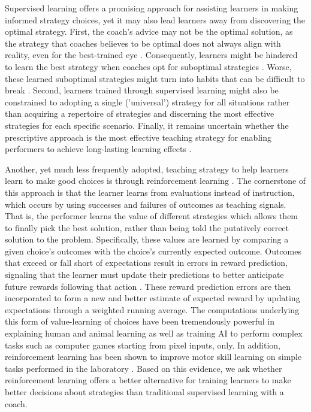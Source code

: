 Supervised learning offers a promising approach for assisting learners in making informed strategy choices, yet it may also lead learners away from discovering the optimal strategy. First, the coach's advice may not be the optimal solution, as the strategy that coaches believes to be optimal does not always align with reality, even for the best-trained eye \cite{supej_impact_2019, cochrum_visual_2021}. Consequently, learners might be hindered to learn the best strategy when coaches opt for suboptimal strategies \cite{gray_plateaus_2017}. Worse, these learned suboptimal strategies might turn into habits that can be difficult to break \cite{popp_effect_2020}. Second, learners trained through supervised learning might also be constrained to adopting a single ('universal') strategy for all situations rather than acquiring a repertoire of strategies and discerning the most effective strategies for each specific scenario. Finally, it remains uncertain whether the prescriptive approach is the most effective teaching strategy for enabling performers to achieve long-lasting learning effects \cite{wulf_instructions_1997, hodges_role_1999, williams_practice_2005,williams_effective_2023}. 

Another, yet much less frequently adopted, teaching strategy to help learners learn to make good choices is through reinforcement learning \cite{sutton_reinforcement_2018}. The cornerstone of this approach is that the learner learns from evaluations instead of instruction, which occurs by using successes and failures of outcomes as teaching signals. That is, the performer learns the value of different strategies which allows them to finally pick the best solution, rather than being told the putatively correct solution to the problem. Specifically, these values are learned by comparing a given choice's outcomes with the choice's currently expected outcome. Outcomes that exceed or fall short of expectations result in errors in reward prediction, signaling that the learner must update their predictions to better anticipate future rewards following that action \cite{rescorla_theory_1972}. These reward prediction errors are then incorporated to form a new and better estimate of expected reward by updating expectations through a weighted running average. The computations underlying this form of value-learning of choices have been tremendously powerful in explaining human and animal learning \cite{waelti_dopamine_2001, schultz_neural_1997, pessiglione_dopamine-dependent_2006,lee_neural_2012, law_reinforcement_2009} as well as training AI to perform complex tasks such as computer games starting from pixel inputs, only\cite{mnih_human-level_2015}. In addition, reinforcement learning has been shown to improve motor skill learning on simple tasks performed in the laboratory \cite{lior_shmuelof_overcoming_2012, abe_reward_2011, truong_error-based_2023, hasson_reinforcement_2015}. Based on this evidence, we ask whether reinforcement learning offers a better alternative for training learners to make better decisions about strategies than traditional supervised learning with a coach. 



